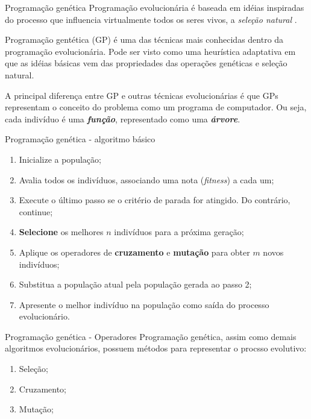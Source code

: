 \documentclass{beamer}
\begin{document}
  \begin{frame}{Programação genética}
      Programação evolucionária é baseada em idéias inspiradas do processo que influencia virtualmente todos os seres vivos, a \textit{seleção natural} \cite{geneticrl}.

      Programação gentética (GP) é uma das técnicas mais conhecidas dentro da programação evolucionária. Pode ser visto como uma heurística adaptativa em que as idéias básicas vem das propriedades das operações genéticas e seleção natural.

      A principal diferença entre GP e outras técnicas evolucionárias é que GPs representam o conceito do problema como um programa de computador. Ou seja, cada indivíduo é uma \textbf{\textit{função}}, representado como uma \textbf{\textit{árvore}}.
  \end{frame}
  \begin{frame}{Programação genética - algoritmo básico}
      \begin{enumerate}
          \item Inicialize a população;
          \item Avalia todos os indivíduos, associando uma nota (\textit{fitness}) a cada um;
          \item Execute o último passo se o critério de parada for atingido. Do contrário, continue;
          \item \textbf{Selecione} os melhores $n$ indivíduos para a próxima geração;
          \item Aplique os operadores de \textbf{cruzamento} e \textbf{mutação} para obter $m$ novos indivíduos;
          \item Substitua a população atual pela população gerada ao passo 2;
          \item Apresente o melhor indivíduo na população como saída do processo evolucionário.
      \end{enumerate}
  \end{frame}
  \begin{frame}{Programação genética - Operadores}
      Programação genética, assim como demais algoritmos evolucionários, possuem métodos para representar o procsso evolutivo:
      \begin{enumerate}
          \item Seleção;
          \item Cruzamento;
          \item Mutação;
      \end{enumerate}
  \end{frame}
\end{document}
